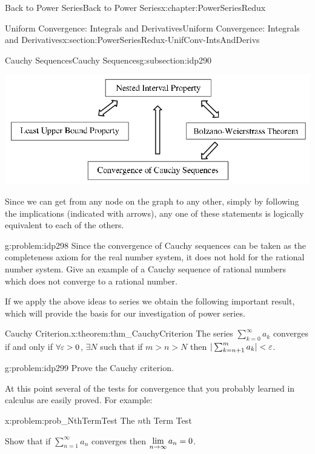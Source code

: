 \begin{chapterptx}{Back to Power Series}{}{Back to Power Series}{}{}{x:chapter:PowerSeriesRedux}
\begin{sectionptx}{Uniform Convergence: Integrals and Derivatives}{}{Uniform Convergence: Integrals and Derivatives}{}{}{x:section:PowerSeriesRedux-UnifConv-IntsAndDerivs}
\begin{subsectionptx}{Cauchy Sequences}{}{Cauchy Sequences}{}{}{g:subsection:idp290}
			\begin{image}{0}{1}{0}%
				\includegraphics[width=\linewidth]{external/images/CompletenessAxioms.png}
			\end{image}%
			Since we can get from any node on the graph to any other, simply by following the implications (indicated with arrows), any one of these statements is logically equivalent to each of the others.%
			\begin{problem}{}{g:problem:idp298}%
				 Since the convergence of Cauchy sequences can be taken as the completeness axiom for the real number system, it does not hold for the rational number system. Give an example of a Cauchy sequence of rational numbers which does not converge to a rational number.%
			\end{problem}
			If we apply the above ideas to series we obtain the following important result, which will provide the basis for our investigation of power series.%
			\begin{theorem}{Cauchy Criterion.}{}{x:theorem:thm_CauchyCriterion}%
				The series \(\sum_{k=0}^\infty a_k\) converges if and only if \(\forall \varepsilon>0\), \(\exists N\) such that if \(m>n>N\) then \(|\sum_{k=n+1}^ma_k|< \varepsilon\).%
			\end{theorem}
			\begin{problem}{}{g:problem:idp299}%
				 Prove the Cauchy criterion.%
			\end{problem}
			At this point several of the tests for convergence that you probably learned in calculus are easily proved.  For example:%
			\begin{problem}{}{x:problem:prob_NthTermTest}%
				\alert{The \(n\)th Term Test}%
				\par
				 Show that if \(\sum_{n=1}^\infty a_n\) converges then \({\displaystyle\lim_{n\rightarrow \infty}a_n}=0\).%
			\end{problem}

\end{subsectionptx}
\end{sectionptx}
\end{chapterptx}
